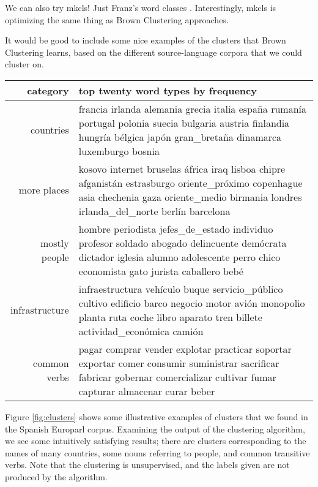 We can also try mkcls! Just Franz's word classes \cite{och1999efficient}.
Interestingly, mkcls is optimizing the same thing as Brown Clustering
approaches.


It would be good to include some nice examples of the clusters that Brown
Clustering learns, based on the different source-language corpora that we could
cluster on.


\begin{figure*}[t!]
  \begin{tabular}{|r|p{10cm}|}
    \hline
    category  & top twenty word types by frequency \\
    \hline
    countries & francia irlanda alemania grecia italia españa rumanía portugal polonia suecia bulgaria austria finlandia hungría bélgica japón gran\_bretaña dinamarca luxemburgo bosnia \\
    \hline
    more places & kosovo internet bruselas áfrica iraq lisboa chipre afganistán estrasburgo oriente\_próximo copenhague asia chechenia gaza oriente\_medio birmania londres irlanda\_del\_norte berlín barcelona \\
    \hline
    mostly people & hombre periodista jefes\_de\_estado individuo profesor soldado abogado delincuente demócrata dictador iglesia alumno adolescente perro chico economista gato jurista caballero bebé \\
    \hline
    infrastructure & infraestructura vehículo buque servicio\_público cultivo edificio barco negocio motor avión monopolio planta ruta coche libro aparato tren billete actividad\_económica camión \\
    \hline
    common verbs & pagar comprar vender explotar practicar soportar exportar comer consumir suministrar sacrificar fabricar gobernar comercializar cultivar fumar capturar almacenar curar beber \\
    \hline
  \end{tabular}
\caption{Some illustrative clusters found by the Brown clustering algorithm on
the Spanish Europarl data. These are five out of $C=1000$ clusters, and
were picked and labeled by hand. The words listed are the
top twenty terms from that cluster, by frequency.}
\label{fig:clusters}
\end{figure*}

Figure \ref{fig:clusters} shows some illustrative examples of clusters that
we found in the Spanish Europarl corpus.  Examining the output of the
clustering algorithm, we see some intuitively satisfying results; there are
clusters corresponding to the names of many countries, some nouns referring to
people, and common transitive verbs. Note that the clustering is unsupervised,
and the labels given are not produced by the algorithm.


